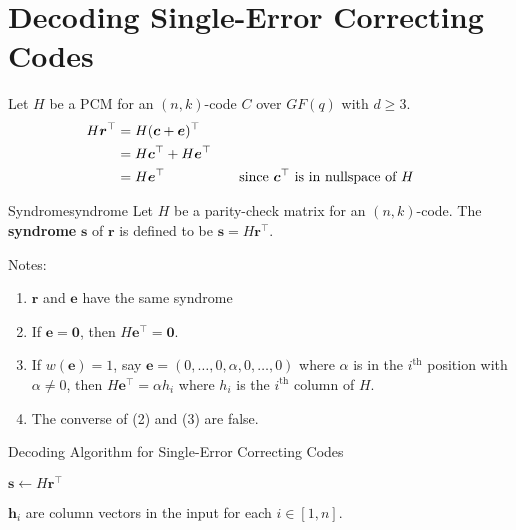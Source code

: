 \section{Decoding Single-Error Correcting Codes}
Let $ H $ be a PCM for an $ (n,k) $-code $ C $ over $ GF(q) $
with $ d\geqslant 3 $.
\begin{align*}
    H\bm{r}^\top
     & =H(\bm{c}+\bm{e})^\top                                                                      \\
     & =H\bm{c}^\top+H \bm{e}^\top                                                                 \\
     & =H\bm{e}^\top               & \quad & \text{since $ \bm{c}^\top $ is in nullspace of $ H$ }
\end{align*}

\begin{Definition}{Syndrome}{syndrome}
    Let $ H $ be a parity-check matrix for an $ (n,k) $-code.
    The \textbf{syndrome} $ \bm{s} $ of $ \bm{r} $
    is defined to be $ \bm{s}=H\bm{r}^\top $.
\end{Definition}

Notes:
\begin{enumerate}[label=(\arabic*)]
    \item $ \bm{r} $ and $ \bm{e} $ have the same syndrome
    \item If $ \bm{e}=\bm{0} $, then $ H\bm{e}^\top=\bm{0} $.
    \item If $ w(\bm{e})=1 $, say $ \bm{e}=(0,\ldots,0,\alpha,0,\ldots,0) $
          where $ \alpha $ is in the $ i^{\text{th}} $ position with $ \alpha \neq 0 $,
          then $ H\bm{e}^\top=\alpha h_i $ where $ h_i $ is the $ i^{\text{th}} $
          column of $ H $.
    \item The converse of (2) and (3) are false.
\end{enumerate}

\begin{algbox}
    \begin{algorithm}[H]
        \DontPrintSemicolon{}
        \caption{Decoding Algorithm for Single-Error Correcting Codes}\label{alg:Decoding Algorithm for Single-Error Correcting Codes}

        $ \bm{s}\gets H\bm{r}^\top $\;
         {
        }
         {
             {
            }
        }
        \Return{}
    \end{algorithm}
\end{algbox}
\begin{Remark}{}{}
    $ \bm{h}_i $ are column vectors in the input for each $ i\in[1,n] $.
\end{Remark}

